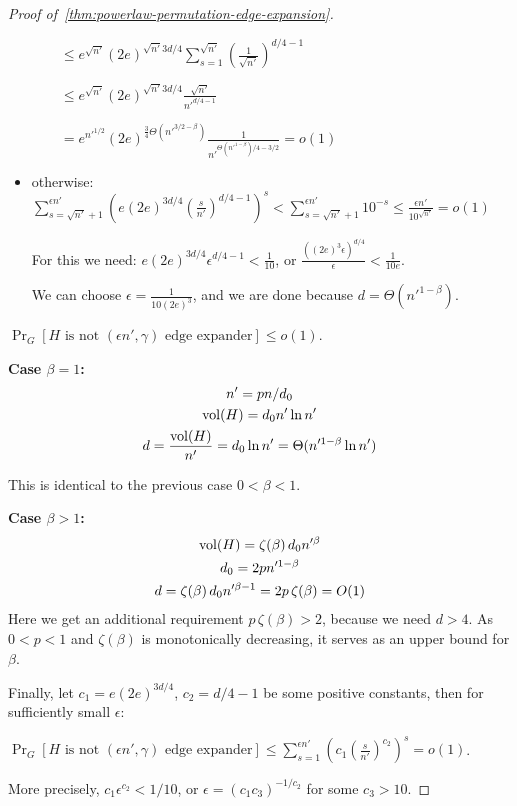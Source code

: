 \begin{proof}[Proof of~\autoref{thm:powerlaw-permutation-edge-expansion}]
\begin{itemize}
        $\qquad\leq e^{\sqrt{n'}}(2e)^{\sqrt{n'}3d/4}\sum_{s=1}^{\sqrt{n'}}{
            \left(\frac{1}{\sqrt{n'}}\right)^{d/4-1}
        }$

        $\qquad\leq e^{\sqrt{n'}}(2e)^{\sqrt{n'}3d/4}
        \frac{\sqrt{n'}}{n'^{d/4-1}}$
        
        $\qquad=e^{n'^{1/2}}(2e)^{\frac{3}{4}\Theta(n'^{3/2-\beta})}
        \frac{1}{n'^{\Theta(n'^{1-\beta})/4-3/2}}=o(1)$

        \item otherwise:
        $\sum_{s=\sqrt{n'}+1}^{\epsilon n'}{\left(
            e
            (2e)^{3d/4}
            \left(\frac{s}{n'}\right)^{d/4-1}
        \right)^s}
        <\sum_{s=\sqrt{n'}+1}^{\epsilon n'}{10^{-s}}\leq\frac{\epsilon n'}{10^{\sqrt{n'}}}=o(1)$
        
        For this we need:
        $e(2e)^{3d/4}\epsilon^{d/4-1}<\frac{1}{10}$, or
        $\frac{((2e)^3\epsilon)^{d/4}}{\epsilon}<\frac{1}{10e}$.
        
        We can choose $\epsilon=\frac{1}{10(2e)^3}$, and we are done because $d=\Theta(n'^{1-\beta})$.
    \end{itemize}
    
    $\Pr_G[H\text{ is not }(\epsilon n',\gamma)\text{ edge expander}]\leq o(1)$.
    
    \textbf{Case $\beta=1$:}
    \begin{gather*}
        n'=pn/d_0\\
        \operatorname*{vol}(H)=d_0n'\ln n'\\
        d=\frac{\operatorname*{vol}(H)}{n'}=d_0\ln n'=\Theta(n'^{1-\beta}\ln n')
    \end{gather*}
    
    This is identical to the previous case $0<\beta<1$.
    
    \textbf{Case $\beta>1$:}
    \begin{gather*}
        \operatorname*{vol}(H)=\zeta(\beta)\,d_0n'^\beta\\
        d_0=2pn'^{1-\beta}\\
        d=\zeta(\beta)\,d_0n'^{\beta-1}=2p\,\zeta(\beta)=O(1)
    \end{gather*}
    Here we get an additional requirement $p\,\zeta(\beta)>2$, because we need $d>4$.
    As~$0<p<1$ and $\zeta(\beta)$ is monotonically decreasing, it serves as an upper bound for $\beta$.

    Finally, let $c_1=e(2e)^{3d/4}$, $c_2=d/4-1$ be some positive constants,
    then for sufficiently small $\epsilon$:

    $\Pr_G[H\text{ is not }(\epsilon n',\gamma)\text{ edge expander}]
    \leq\sum_{s=1}^{\epsilon n'}{\left(c_1\left(\frac{s}{n'}\right)^{c_2}\right)^s}=o(1)$.
    
    More precisely, $c_1\epsilon^{c_2}<1/10$, or
    $\epsilon=(c_1c_3)^{-1/c_2}$ for some $c_3>10$.
\end{proof}

